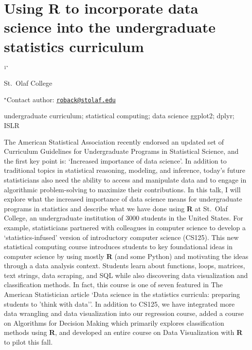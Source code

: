 \documentclass[\main/boa.tex]{subfiles}
\begin{document}
\section{Using R to incorporate data science into the undergraduate statistics
curriculum}

\begin{center}
  {\bf {}$^{1^\star}$}
\end{center}

\vskip 0.3cm

\begin{affiliations}
\begin{enumerate}
\begin{minipage}{0.915\textwidth}
\centering
\item St.~Olaf College \\[-2pt]
\end{minipage}
\end{enumerate}
$^\star$Contact author: \href{mailto:roback@stolaf.edu}{\nolinkurl{roback@stolaf.edu}}\\
\end{affiliations}

\vskip 0.5cm

\begin{minipage}{0.915\textwidth}
\keywords undergraduate curriculum; statistical computing; data science
\packages ggplot2; dplyr; ISLR
\end{minipage}

\vskip 0.8cm

The American Statistical Association recently endorsed an updated set of
Curriculum Guidelines for Undergraduate Programs in Statistical Science,
and the first key point is: `Increased importance of data science'. In
addition to traditional topics in statistical reasoning, modeling, and
inference, today's future statisticians also need the ability to access
and manipulate data and to engage in algorithmic problem-solving to
maximize their contributions. In this talk, I will explore what the
increased importance of data science means for undergraduate programs in
statistics and describe what we have done using \textbf{R} at St.~Olaf
College, an undergraduate institution of 3000 students in the United
States. For example, statisticians partnered with colleagues in computer
science to develop a `statistics-infused' version of introductory
computer science (CS125). This new statistical computing course
introduces students to key foundational ideas in computer science by
using mostly \textbf{R} (and some Python) and motivating the ideas
through a data analysis context. Students learn about functions, loops,
matrices, text strings, data scraping, and SQL while also discovering
data visualization and classification methods. In fact, this course is
one of seven featured in The American Statistician article `Data science
in the statistics curricula: preparing students to 'think with data''.
In addition to CS125, we have integrated more data wrangling and data
visualization into our regression course, added a course on Algorithms
for Decision Making which primarily explores classification methods
using \textbf{R}, and developed an entire course on Data Visualization
with \textbf{R} to pilot this fall.
\end{document}
